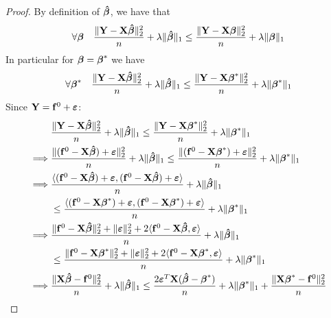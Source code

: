 \begin{proof}
    By definition of $\btahat$, we have that
    $$
        \forall \bta \quad \frac{\| \Y -\X \btahat \|_{2}^{2}}{n} + \lambda \| \btahat \|_{1} \leq \frac{\|\Y-\X \bta \|_{2}^{2}}{n}+\lambda \| \bta \|_{1}
    $$
    In particular for $\bta = \bta^*$ we have
    $$
        \forall \bta^* \quad \frac{\| \Y -\X \btahat \|_{2}^{2}}{n} + \lambda \| \btahat \|_{1} \leq \frac{\|\Y-\X \bta^* \|_{2}^{2}}{n}+\lambda \| \bta^* \|_{1}
    $$
    Since $\Y = \mathbf{f}^0 + \eps$:
    \begin{align*}
                 & \frac{\|\Y  - \X \btahat \|_{2}^{2}}{n} + \lambda \| \btahat\|_{1} \leq \frac{\| \Y  - \X \bta^* \|_2^2}{n}+\lambda\|\bta^{*}\|_{1}                                                       \\
        \implies &
        \frac{\| (\mathbf{f}^0 - \X \btahat ) + \eps \|_{2}^{2}}{n} + \lambda\| \btahat \|_{1} \leq \frac{ \| (\mathbf{f}^0 - \X \bta^*) + \eps \|_{2}^{2}}{n}+\lambda \| \bta^*\|_{1}                       \\
        \implies &
        \frac{\langle (\mathbf{f}^0 - \X \btahat ) + \eps, (\mathbf{f}^0 - \X \btahat ) + \eps \rangle}{n} + \lambda\| \btahat \|_{1}                                                                        \\
                 & \leq \frac{ \langle (\mathbf{f}^0 - \X \bta^*) + \eps, (\mathbf{f}^0 - \X \bta^*) + \eps \rangle}{n}+\lambda \| \bta^*\|_{1}                                                              \\
        \implies &
        \frac{\|\mathbf{f}^0 - \X \btahat \|_{2}^{2} + \| \eps \|_{2}^{2} + 2\langle \mathbf{f}^0 - \X \btahat, \eps \rangle}{n} + \lambda\| \btahat \|_{1}                                                  \\
                 & \leq \frac{\|\mathbf{f}^0 - \X \bta^* \|_{2}^{2} + \| \eps \|_{2}^{2} + 2\langle \mathbf{f}^0 - \X \bta^*, \eps \rangle}{n}+\lambda \| \bta^*\|_{1}                                       \\
        \implies &
        \frac{\|\X \btahat - \mathbf{f}^0 \|_{2}^{2}}{n} + \lambda\| \btahat \|_{1} \leq \frac{2 \eps^T \X (\btahat - \bta^*)}{n} + \lambda \| \bta^*\|_{1} + \frac{\|\X \bta^* - \mathbf{f}^0\|_{2}^{2}}{n} \\
    \end{align*}
\end{proof}

